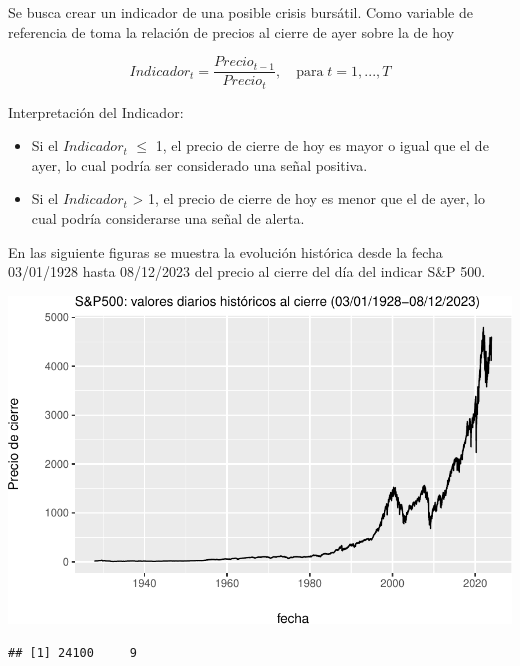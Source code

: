 \documentclass[
  oneside]{article}
\begin{document}
Se busca crear un indicador de una posible crisis bursátil. Como
variable de referencia de toma la relación de precios al cierre de ayer
sobre la de hoy

\begin{equation}
Indicador_t=\frac{Precio_{t-1}}{Precio_t},\quad\text{para}\; t=1,...,T \label{eq:ind}
\end{equation} \vspace{0.5cm}

Interpretación del Indicador:

\begin{itemize}
\item Si el $Indicador_t$    $\leq$ 1, el precio de cierre de hoy es mayor o igual que el de ayer, lo cual podría ser considerado una señal positiva.
\item Si el $Indicador_t$ > 1, el precio de cierre de hoy es menor que el de ayer, lo cual podría considerarse una señal de alerta.
\end{itemize}

\vspace{1cm}

\newpage

En las siguiente figuras se muestra la evolución histórica desde la
fecha 03/01/1928 hasta 08/12/2023 del precio al cierre del día del
indicar S\&P 500.

\includegraphics{main_files/figure-latex/plot1-1.pdf}

\begin{verbatim}
## [1] 24100     9
\end{verbatim}
\end{document}
